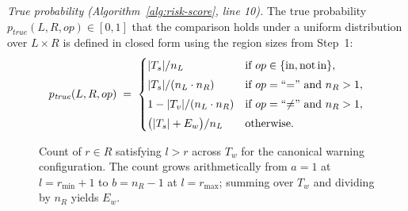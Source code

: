 \documentclass[pdflatex,sn-basic]{sn-jnl}%
\theoremstyle{thmstyleone}%
\theoremstyle{thmstyletwo}%
\theoremstyle{thmstylethree}%
\begin{document}
\smallskip
\noindent\textit{True probability (Algorithm~\ref{alg:risk-score}, line 10).}
The true probability $p_{\mathit{true}}(L, R, op) \in [0, 1]$ that the comparison holds under a uniform distribution over $L \times R$ is defined in closed form using the region sizes from Step~1:
\[
p_{\mathit{true}}(L, R, op) \;=\;
\begin{cases}
|T_s| / n_L & \text{if } op \in \{\text{in}, \text{not\,in}\}, \\[3pt]
|T_s| / (n_L \cdot n_R) & \text{if } op = \text{``=''} \text{ and } n_R > 1, \\[3pt]
1 - |T_v| / (n_L \cdot n_R) & \text{if } op = \text{``$\neq$''} \text{ and } n_R > 1, \\[3pt]
\bigl(|T_s| + E_w\bigr) / n_L & \text{otherwise.}
\end{cases}
\]

\begin{figure}[t]
\centering
\vspace{4pt}

\vspace{6pt}
\caption{Count of $r \in R$ satisfying $l > r$ across $T_w$ for the canonical warning configuration. The count grows arithmetically from $a = 1$ at $l = r_{\min}{+}1$ to $b = n_R - 1$ at $l = r_{\max}$; summing over $T_w$ and dividing by $n_R$ yields $E_w$.}
\label{fig:arithmetic-series}
\vspace{4pt}
\end{figure}
\end{document}

